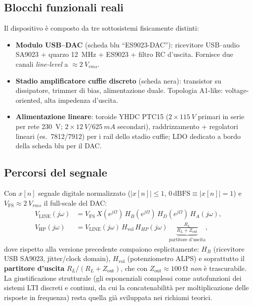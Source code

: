 \subsection{Blocchi funzionali reali}
Il dispositivo è composto da tre sottosistemi fisicamente distinti:
\begin{itemize}
  \item \textbf{Modulo USB--DAC} (scheda blu ``ES9023-DAC''): ricevitore
        USB--audio SA9023 + quarzo \SI{12}{MHz} + ES9023 + filtro RC
        d'uscita. Fornisce due canali \emph{line-level} a $\approx\SI{2}{V_{rms}}$.
  \item \textbf{Stadio amplificatore cuffie discreto} (scheda nera):
        transistor su dissipatore, trimmer di bias, alimentazione duale.
        Topologia A1-like: voltage-oriented, alta impedenza d'uscita.
  \item \textbf{Alimentazione lineare}: toroide YHDC PTC15
        ($2\times\SI{115}{V}$ primari in serie per rete \SI{230}{V};
        $2\times\SI{12}{V}/\SI{625}{mA}$ secondari), raddrizzamento +
        regolatori lineari (es.\ 7812/7912) per i rail dello stadio
        cuffie; LDO dedicato a bordo della scheda blu per il DAC.
\end{itemize}

\subsection{Percorsi del segnale}
Con $x[n]$ segnale digitale normalizzato ($|x[n]|\le1$, $0\,\mathrm{dBFS}\equiv|x[n]|=1$)
e $V_{\mathrm{FS}}\approx\SI{2}{V_{rms}}$ il full-scale del DAC:
\begin{align}
  V_{\text{LINE}}(j\omega) &=
     V_{\mathrm{FS}}\,X(e^{j\Omega})\,H_{B}(e^{j\Omega})\,H_{D}(e^{j\Omega})\,H_{A}(j\omega), \\[2pt]
  V_{\text{HP}}(j\omega) &=
     V_{\text{LINE}}(j\omega)\,H_{\text{vol}}\,H_{HP}(j\omega)\,
     \underbrace{\frac{R_L}{R_L+Z_{\text{out}}}}_{\text{partitore d'uscita}} ,
\end{align}
dove rispetto alla versione precedente compaiono esplicitamente:
$H_B$ (ricevitore USB SA9023, jitter/clock domain), $H_{\text{vol}}$
(potenziometro ALPS) e soprattutto il \textbf{partitore d'uscita}
$R_L/(R_L+Z_{\text{out}})$, che con $Z_{\text{out}}\approx\SI{100}{\ohm}$
\emph{non} è trascurabile. La giustificazione strutturale (gli
esponenziali complessi come autofunzioni dei sistemi LTI discreti e
continui, da cui la concatenabilità per moltiplicazione delle risposte
in frequenza) resta quella già sviluppata nei richiami teorici.

